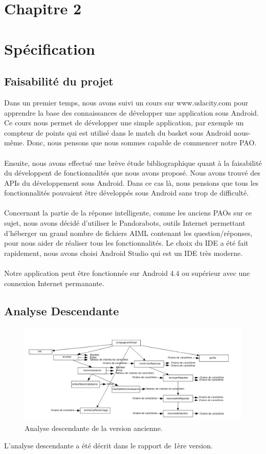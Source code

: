 \section*{Chapitre 2}
\section{Spécification}
\subsection{Faisabilité du projet}
Dans un premier temps, nous avons suivi un cours sur www.udacity.com pour apprendre la base des connaissances de développer une application sous Android. Ce cours nous permet de développer une simple application, par exemple un compteur de points qui est utilisé dans le match du basket sous Android nous-même. Donc, nous pensons que nous sommes capable de commencer notre PAO.\\\\
\indent Ensuite, nous avons effectué une brève étude bibliographique quant à la faisabilité du développent de fonctionnalités que nous avons proposé. Nous avons trouvé des APIs du développement sous Android. Dans ce cas là, nous pensions que tous les fonctionnalités pouvaient être développés sous Android sans trop de difficulté. \\\\
\indent Concernant la partie de la réponse intelligente, comme les anciens PAOs sur ce sujet, nous avons décidé d'utiliser le Pandorabots, outils Internet permettant d'héberger un grand nombre de fichiers AIML contenant les question/réponses, pour nous aider de réaliser tous les fonctionnalités.
Le choix du IDE a été fait rapidement, nous avons choisi Android Studio qui est un IDE très moderne. \\\\
\indent Notre application peut être fonctionnée sur Android 4.4 ou supérieur avec une connexion Internet permanante.\\

\subsection{Analyse Descendante}
\begin{figure}[h]
\centering
\includegraphics[width=1\linewidth]{analyseDescendante.png}
\caption{Analyse descendante de la version ancienne.\label{fig1}}
\end{figure}
\indent L'analyse descendante a été décrit dans le rapport  de 1ère version.
\newpage

